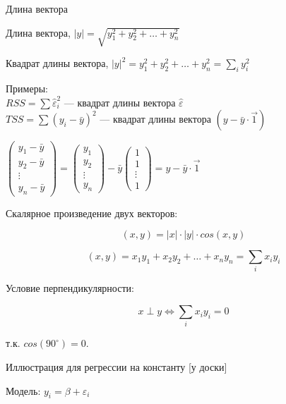 \documentclass[ignorenonframetext,]{beamer}
\begin{document}
\begin{frame}{Длина вектора}

Длина вектора, \(|y|=\sqrt{y_1^2+y_2^2+\ldots+ y_n^2}\)

Квадрат длины вектора, \(|y|^2=y_1^2+y_2^2+\ldots + y_n^2=\sum_i y_i^2\)

Примеры:\\\(RSS=\sum \hat{\varepsilon}_i^2\) --- квадрат длины вектора
\(\hat{\varepsilon}\)\\\(TSS=\sum (y_i-\bar{y})^2\) --- квадрат длины
вектора \((y-\bar{y}\cdot \vec{1})\)

\(\begin{pmatrix} y_1-\bar{y} \\ y_2-\bar{y} \\ \vdots \\ y_n-\bar{y} \end{pmatrix} = \begin{pmatrix} y_1 \\ y_2 \\ \vdots \\ y_n \end{pmatrix} - \bar{y}\begin{pmatrix} 1 \\ 1 \\ \vdots \\ 1 \end{pmatrix}=y-\bar{y}\cdot \vec{1}\)

\end{frame}

\begin{frame}{Скалярное произведение двух векторов:}

\[
(x,y)=|x|\cdot |y|\cdot cos(x,y)
\]

\[
(x,y)=x_1 y_1 +x_2 y_2 +\ldots+ x_n y_n=\sum_i x_i y_i
\]

Условие перпендикулярности:

\[
x \perp y  \Leftrightarrow  \sum_i x_i y_i=0
\]

т.к. \(cos(90^\circ)=0\).

\end{frame}

\begin{frame}{Иллюстрация для регрессии на константу {[}у доски{]}}

Модель: \(y_i=\beta + \varepsilon_i\)

\end{frame}
\end{document}
